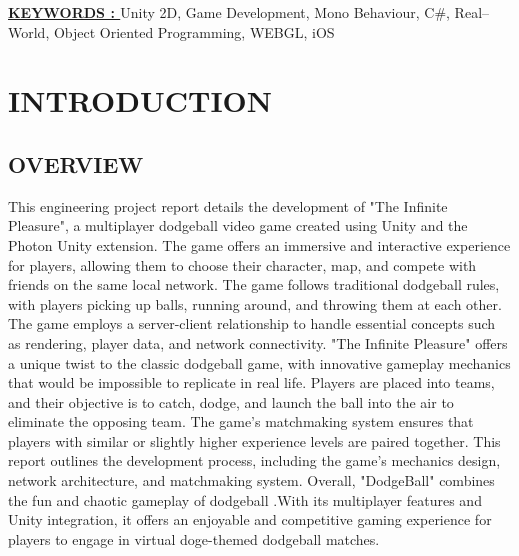 \documentclass[12pt]{report}
\begin{document}
\raggedright{ \textbf \underline{KEYWORDS : }}Unity 2D, Game Development, Mono Behaviour, C\#, Real–World, Object Oriented Programming, WEBGL, iOS

\clearpage



\tableofcontents
\clearpage

\listoffigures
\clearpage
{}
\fancyhead[R]{\thepage}

\centering
\section{INTRODUCTION}
\raggedright
\subsection{OVERVIEW}
\justifying
\setlength{\parindent}{3.7em}
\setlength{\parskip}{0.5em}
\renewcommand{\baselinestretch}{1.5}
\normalsize
\hspace{1cm}
This engineering project report details the development of "The Infinite Pleasure", a multiplayer dodgeball video game created using Unity and the Photon Unity extension. The game offers an immersive and interactive experience for players, allowing them to choose their character, map, and compete with friends on the same local network.
The game follows traditional dodgeball rules, with players picking up balls, running around, and throwing them at each other. The game employs a server-client relationship to handle essential concepts such as rendering, player data, and network connectivity.
"The Infinite Pleasure" offers a unique twist to the classic dodgeball game, with innovative gameplay mechanics that would be impossible to replicate in real life. Players are placed into teams, and their objective is to catch, dodge, and launch the ball into the air to eliminate the opposing team.
The game's matchmaking system ensures that players with similar or slightly higher experience levels are paired together. This report outlines the development process, including the game's mechanics design, network architecture, and matchmaking system.
Overall, "DodgeBall" combines the fun and chaotic gameplay of dodgeball .With its multiplayer features and Unity integration, it offers an enjoyable and competitive gaming experience for players to engage in virtual doge-themed dodgeball matches.
\clearpage
\end{document}
